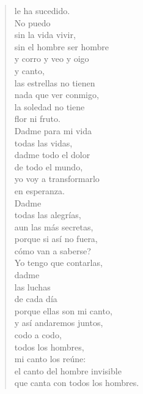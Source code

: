 \documentclass[12pt]{article}
\begin{document}
\begin{verse}
{le ha sucedido.\\
No puedo\\
sin la vida vivir,\\
sin el hombre ser hombre\\
y corro y veo y oigo\\
y canto,\\
las estrellas no tienen\\
nada que ver conmigo,\\
la soledad no tiene\\
flor ni fruto.\\
Dadme para mi vida\\
todas las vidas,\\
dadme todo el dolor\\
de todo el mundo,\\
yo voy a transformarlo\\
en esperanza.\\
Dadme\\
todas las alegrías,\\
aun las más secretas,\\
porque si así no fuera,\\
cómo van a saberse?\\
Yo tengo que contarlas,\\
dadme\\
las luchas\\
de cada día\\
porque ellas son mi canto,\\
y así andaremos juntos,\\
codo a codo,\\
todos los hombres,\\
mi canto los reúne:\\
el canto del hombre invisible\\
que canta con todos los hombres.}  

\end{verse}
\end{document}
